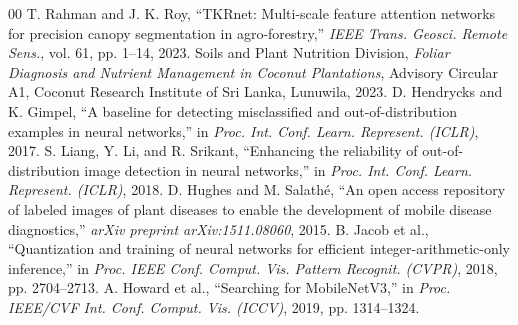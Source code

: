 \documentclass[conference,a4paper]{IEEEtran}
\begin{document}
\begin{thebibliography}{00}
 T. Rahman and J. K. Roy, ``TKRnet: Multi-scale feature attention networks for precision canopy segmentation in agro-forestry,'' \textit{IEEE Trans. Geosci. Remote Sens.}, vol. 61, pp. 1--14, 2023.
 Soils and Plant Nutrition Division, \textit{Foliar Diagnosis and Nutrient Management in Coconut Plantations}, Advisory Circular A1, Coconut Research Institute of Sri Lanka, Lunuwila, 2023.
 D. Hendrycks and K. Gimpel, ``A baseline for detecting misclassified and out-of-distribution examples in neural networks,'' in \textit{Proc. Int. Conf. Learn. Represent. (ICLR)}, 2017.
 S. Liang, Y. Li, and R. Srikant, ``Enhancing the reliability of out-of-distribution image detection in neural networks,'' in \textit{Proc. Int. Conf. Learn. Represent. (ICLR)}, 2018.
 D. Hughes and M. Salath{\'e}, ``An open access repository of labeled images of plant diseases to enable the development of mobile disease diagnostics,'' \textit{arXiv preprint arXiv:1511.08060}, 2015.
 B. Jacob et al., ``Quantization and training of neural networks for efficient integer-arithmetic-only inference,'' in \textit{Proc. IEEE Conf. Comput. Vis. Pattern Recognit. (CVPR)}, 2018, pp. 2704--2713.
 A. Howard et al., ``Searching for MobileNetV3,'' in \textit{Proc. IEEE/CVF Int. Conf. Comput. Vis. (ICCV)}, 2019, pp. 1314--1324.
\end{thebibliography}
\end{document}
